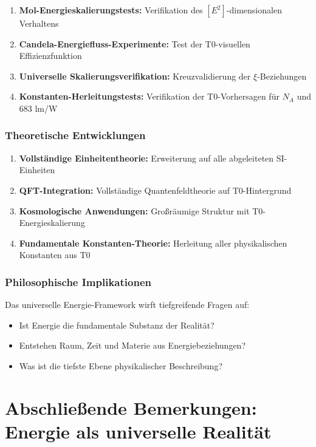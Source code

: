 \documentclass[12pt,a4paper]{article}
\newcommand{\xipar}{\xi}
\begin{document}
	\begin{enumerate}
		\item \textbf{Mol-Energieskalierungstests:} Verifikation des $[E^2]$-dimensionalen Verhaltens
		\item \textbf{Candela-Energiefluss-Experimente:} Test der T0-visuellen Effizienzfunktion
		\item \textbf{Universelle Skalierungsverifikation:} Kreuzvalidierung der $\xipar$-Beziehungen
		\item \textbf{Konstanten-Herleitungstests:} Verifikation der T0-Vorhersagen für $N_A$ und 683 lm/W
	\end{enumerate}
	
	\subsubsection{Theoretische Entwicklungen}
	\label{subsubsec:theoretische_entwicklungen}
	
	\begin{enumerate}
		\item \textbf{Vollständige Einheitentheorie:} Erweiterung auf alle abgeleiteten SI-Einheiten
		\item \textbf{QFT-Integration:} Vollständige Quantenfeldtheorie auf T0-Hintergrund
		\item \textbf{Kosmologische Anwendungen:} Großräumige Struktur mit T0-Energieskalierung
		\item \textbf{Fundamentale Konstanten-Theorie:} Herleitung aller physikalischen Konstanten aus T0
	\end{enumerate}
	
	\subsubsection{Philosophische Implikationen}
	\label{subsubsec:philosophische_implikationen}
	
	Das universelle Energie-Framework wirft tiefgreifende Fragen auf:
	\begin{itemize}
		\item Ist Energie die fundamentale Substanz der Realität?
		\item Entstehen Raum, Zeit und Materie aus Energiebeziehungen?
		\item Was ist die tiefste Ebene physikalischer Beschreibung?
	\end{itemize}
	
	\section{Abschließende Bemerkungen: Energie als universelle Realität}
	\label{sec:abschliessende_bemerkungen}
	
\end{document}
